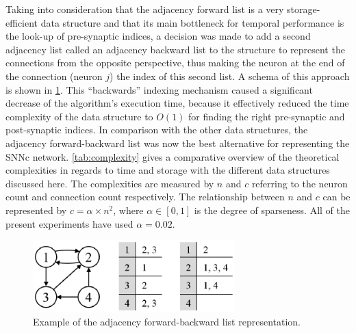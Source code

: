 Taking into consideration that the adjacency forward list is a very storage-efficient data structure and that its main bottleneck for temporal performance is the look-up of pre-synaptic indices, a decision was made to add a second adjacency list called an adjacency backward list to the structure to represent the connections from the opposite perspective, thus making the neuron at the end of the connection (neuron $j$) the index of this second list. A schema of this approach is shown in \figurename \ref{fig:fw_bw_adj_list}. This “backwards” indexing mechanism caused a significant decrease of the algorithm's execution time, because it effectively reduced the time complexity of the data structure to $O(1)$ for finding the right pre-synaptic and post-synaptic indices. In comparison with the other data structures, the adjacency forward-backward list was now the best alternative for representing the SNNc network. \tablename \ref{tab:complexity} gives a comparative overview of the theoretical complexities in regards to time and storage with the different data structures discussed here. The complexities are measured by $n$ and $c$ referring to the neuron count and connection count respectively. The relationship between $n$ and $c$ can be represented by $c=\alpha\times n^2$, where $\alpha\in [0, 1]$ is the degree of sparseness. All of the present experiments have used $\alpha=0.02$. 

\begin{figure}
	\centering
	\includegraphics[width=7.8cm]{fig/largesnn/adj_bw_list.eps}
	\caption{Example of the adjacency forward-backward list representation.}
	\label{fig:fw_bw_adj_list}
\end{figure}

